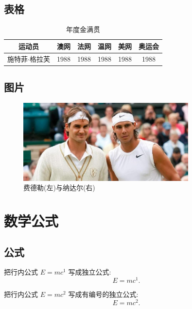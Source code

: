 \documentclass{ctexart}
\begin{document}
    \subsection{表格}
    \begin{table}[htbp]
        \centering
        \def\sg{施特菲$\cdot$格拉芙} %
        \begin{tabular}{c|ccccc}
            \hline
            运动员 & 澳网 & 法网 & 温网 & 美网 & 奥运会\\
            \hline
            \sg & 1988 & 1988 & 1988 & 1988 & 1988 \\
            \hline
        \end{tabular}
        \caption{年度金满贯}
        \label{table} %
    \end{table}
    \subsection{图片}
    \begin{figure}[htbp]
        \centering
        \includegraphics[width=0.8\textwidth]{img/fn.jpeg}
        \caption{费德勒(左)与纳达尔(右)}
        \label{figure} %
    \end{figure}
    \section{数学公式}
    \subsection{公式}
    把行内公式 $E=mc^1$ 写成独立公式:
    \begin{equation*}
        E=mc^1.
    \end{equation*}

    把行内公式 $E=mc^2$ 写成有编号的独立公式:
    \begin{equation}
        E=mc^2. \label{eq2}
    \end{equation}
\end{document}
